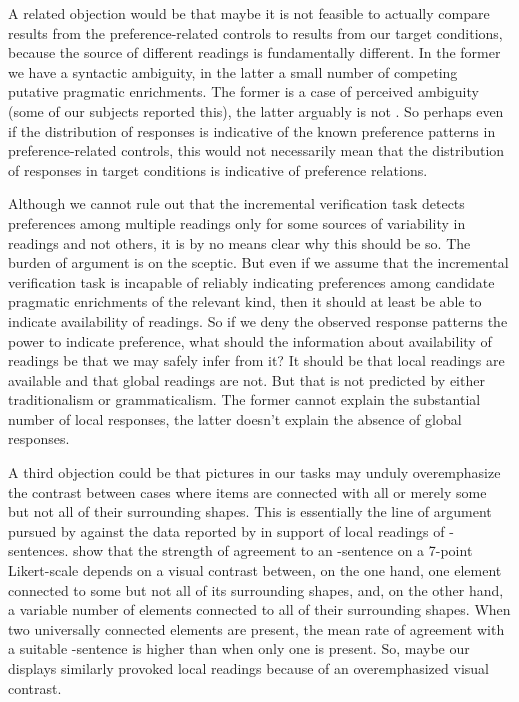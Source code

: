 \documentclass[fleqn,reqno,10pt,draft]{article}
\renewcommand{\es}{\acro{es}}
\begin{document}
A related objection would be that maybe it is not feasible to actually
compare results from the preference-related controls to results from
our target conditions, because the source of different readings is
fundamentally different. In the former we have a syntactic ambiguity,
in the latter a small number of competing putative pragmatic
enrichments. The former is a case of perceived ambiguity (some of our
subjects reported this), the latter arguably is not
\citep[see][]{GeurtsPouscoulous2009:Embedded-Implic}. So perhaps even
if the distribution of responses is indicative of the known preference
patterns in preference-related controls, this would not necessarily
mean that the distribution of responses in target conditions is
indicative of preference relations.

Although we cannot rule out that the incremental verification task
detects preferences among multiple readings only for some sources of
variability in readings and not others, it is by no means clear why
this should be so. The burden of argument is on the sceptic. But even
if we assume that the incremental verification task is incapable of
reliably indicating preferences among candidate pragmatic enrichments
of the relevant kind, then it should at least be able to indicate
availability of readings. So if we deny the observed response patterns
the power to indicate preference, what should the information about
availability of readings be that we may safely infer from it? It
should be that local readings are available and that global readings
are not. But that is not predicted by either traditionalism or
grammaticalism. The former cannot explain the substantial number of
local responses, the latter doesn't explain the absence of global
responses.

A third objection could be that pictures in our tasks may unduly
overemphasize the contrast between cases where items are connected
with all or merely some but not all of their surrounding shapes. This
is essentially the line of argument pursued by
\citet{GeurtsTielvan-Tiel2013:Scalar-expressi} against the data
reported by \citet{ChemlaSpector2010:Experimental-Ev} in support of
local readings of
\es-sentences. \citeauthor{GeurtsTielvan-Tiel2013:Scalar-expressi}
show that the strength of agreement to an \es-sentence on a 7-point
Likert-scale depends on a visual contrast between, on the one hand,
one element connected to some but not all of its surrounding shapes,
and, on the other hand, a variable number of elements connected to all
of their surrounding shapes. When two universally connected elements
are present, the mean rate of agreement with a suitable \es-sentence
is higher than when only one is present. So, maybe our displays
similarly provoked local readings because of an overemphasized visual
contrast.
\end{document}

